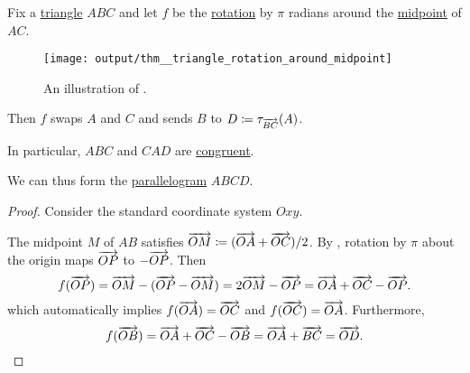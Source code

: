 \begin{lemma}\label{thm:triangle_rotation_around_midpoint}
  Fix a \hyperref[def:triangle]{triangle} \( ABC \) and let \( f \) be the \hyperref[def:rigid_motion/rotation]{rotation} by \( \pi \) radians around the \hyperref[thm:segment_midpoint]{midpoint} of \( AC \).

  \begin{figure}[!ht]
    \centering
    \texttt{[image: output/thm\_\_triangle\_rotation\_around\_midpoint]}
    \caption{An illustration of .}\label{fig:thm:triangle_rotation_around_midpoint}
  \end{figure}

  Then \( f \) swaps \( A \) and \( C \) and sends \( B \) to \( D \coloneqq \tau_{\overrightarrow{BC}}(A) \).
\end{lemma}
\begin{comments}
  \item In particular, \( ABC \) and \( CAD \) are \hyperref[def:congruent_shapes]{congruent}.
  \item We can thus form the \hyperref[def:parallelogram]{parallelogram} \( ABCD \).
\end{comments}
\begin{proof}
  Consider the standard coordinate system \( Oxy \).

  The midpoint \( M \) of \( AB \) satisfies \( \overrightarrow{OM} \coloneqq (\overrightarrow{OA} + \overrightarrow{OC}) / 2 \). By , rotation by \( \pi \) about the origin maps \( \overrightarrow{OP} \) to \( -\overrightarrow{OP} \). Then
  \begin{equation*}
    f(\overrightarrow{OP}) = \overrightarrow{OM} - (\overrightarrow{OP} - \overrightarrow{OM}) = 2\overrightarrow{OM} - \overrightarrow{OP} = \overrightarrow{OA} + \overrightarrow{OC} - \overrightarrow{OP}.
  \end{equation*}
  which automatically implies \( f(\overrightarrow{OA}) = \overrightarrow{OC} \) and \( f(\overrightarrow{OC}) = \overrightarrow{OA} \). Furthermore,
  \begin{equation*}
    f(\overrightarrow{OB}) = \overrightarrow{OA} + \overrightarrow{OC} - \overrightarrow{OB} = \overrightarrow{OA} + \overrightarrow{BC} = \overrightarrow{OD}.
  \end{equation*}
\end{proof}

